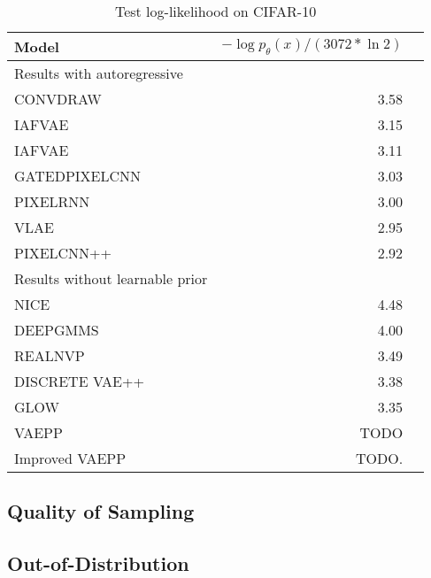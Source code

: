 \begin{table}
\centering
\begin{tabular}{lrr}  
\toprule
Model  &  $-\log p_\theta(x) / (3072 * \ln 2)$ \\
\midrule
Results with autoregressive   \\
CONVDRAW         &  3.58      \\
IAFVAE           &  3.15      \\
IAFVAE           &  3.11      \\
GATEDPIXELCNN    &  3.03      \\
PIXELRNN         &  3.00      \\
VLAE             &  2.95      \\
PIXELCNN++       &  2.92      \\
\midrule
Results without learnable prior   \\
NICE             &  4.48      \\
DEEPGMMS         &  4.00      \\
REALNVP          &  3.49      \\
DISCRETE VAE++   &  3.38      \\
GLOW             &  3.35      \\
VAEPP            &  TODO      \\
Improved VAEPP   &  TODO.     \\
\bottomrule
\end{tabular}
\caption{Test log-likelihood on CIFAR-10}
\label{tab:cifar-nll}
\end{table}

\subsection{Quality of Sampling}


\subsection{Out-of-Distribution}


